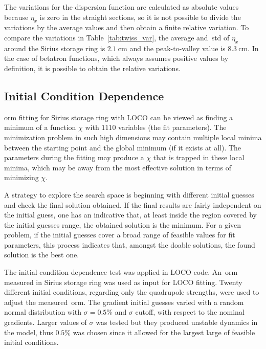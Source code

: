The variations for the dispersion function are calculated as absolute values because $\eta_x$ is zero in the straight sections, so it is not possible to divide the variations by the average values and then obtain a finite relative variation. To compare the variations in Table~\ref{tab:twiss_var}, the average and~\gls{std} of $\eta_x$ around the Sirius storage ring is $\SI{2.1}{\cm}$ and the peak-to-valley value is $\SI{8.3}{\cm}$. In the case of betatron functions, which always assumes positive values by definition, it is possible to obtain the relative variations.

\subsection{Initial Condition Dependence}
\gls{orm} fitting for Sirius storage ring with LOCO can be viewed as finding a minimum of a function $\chi$ with $1110$ variables (the fit parameters). The minimization problem in such high dimensions may contain multiple local minima between the starting point and the global minimum (if it exists at all). The parameters during the fitting may produce a $\chi$ that is trapped in these local minima, which may be away from the most effective solution in terms of minimizing $\chi$.

A strategy to explore the search space is beginning with different initial guesses and check the final solution obtained. If the final results are fairly independent on the initial guess, one has an indicative that, at least inside the region covered by the initial guesses range, the obtained solution is the minimum. For a given problem, if the initial guesses cover a broad range of feasible values for fit parameters, this process indicates that, amongst the doable solutions, the found solution is the best one.

The initial condition dependence test was applied in LOCO code. An~\gls{orm} measured in Sirius storage ring was used as input for LOCO fitting. Twenty different initial conditions, regarding only the quadrupole strengths, were used to adjust the measured~\gls{orm}. The gradient initial guesses varied with a random normal distribution with $\sigma=0.5\%$ and $\sigma$ cutoff, with respect to the nominal gradients. Larger values of $\sigma$ was tested but they produced unstable dynamics in the model, thus $0.5\%$ was chosen since it allowed for the largest large of feasible initial conditions.

